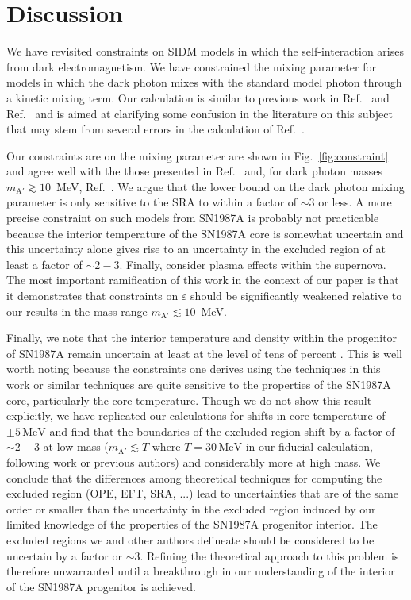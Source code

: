 \documentclass[nofootinbib,prd,superscriptaddress,twocolumn]{revtex4}
\begin{document}
\section{Discussion}
\label{section:conclusions}


We have revisited constraints on SIDM models in which the 
self-interaction arises from dark electromagnetism. We have 
constrained the mixing parameter for models in which the dark photon 
mixes with the standard model photon through a kinetic mixing term. Our calculation 
is similar to previous work in Ref.~\cite{dent_etal12} and Ref.~\cite{rrapaj_reddy16} and 
is aimed at clarifying some confusion in the literature on this subject that may stem 
from several errors in the calculation of Ref.~\cite{dent_etal12}.

Our constraints are on the mixing parameter are shown in 
Fig.~\ref{fig:constraint} and agree well with the those presented in 
Ref.~\cite{rrapaj_reddy16} and, for dark photon masses $m_{\mathrm{A}'} \gtrsim 10$~MeV, 
Ref.~\cite{hardy_lasenby17}. We argue that the lower bound on the dark photon mixing parameter 
is only sensitive to the SRA to within a factor of $\sim 3$ or less. A more precise constraint 
on such models from SN1987A is probably not practicable because the interior temperature 
of the SN1987A core is somewhat uncertain and this uncertainty alone gives rise to an uncertainty 
in the excluded region of at least a factor of $\sim 2-3$. Finally, \citet{hardy_lasenby17} consider 
plasma effects within the supernova. The most important ramification of this work in the context of 
our paper is that it demonstrates that constraints on $\varepsilon$ should be significantly weakened 
relative to our results in the mass range $m_{\mathrm{A}'} \lesssim 10$~MeV.

Finally, we note that the interior temperature and density within the progenitor of SN1987A remain 
uncertain at least at the level of tens of percent \citep[e.g.][]{perego15,farmer16}. This is well worth 
noting because the constraints one derives using the techniques in this work or similar techniques 
are quite sensitive to the properties of the SN1987A core, particularly the core temperature. Though 
we do not show this result explicitly, we have replicated our calculations for shifts in core temperature 
of $\pm 5\, \mathrm{MeV}$ and find that the boundaries of the excluded region shift by a factor of $\sim 2-3$ at low 
mass ($m_{\mathrm{A}'} \lesssim T$ where $T = 30\, \mathrm{MeV}$ in our fiducial calculation, following 
work or previous authors) and considerably more at high mass. 
We conclude that the differences among theoretical techniques for 
computing the excluded region (OPE, EFT, SRA, ...) lead to uncertainties that are of the same order or 
smaller than the uncertainty in the excluded region induced by our limited knowledge of the 
properties of the SN1987A progenitor interior. The excluded regions we and other authors delineate 
should be considered to be uncertain by a factor or $\sim 3$. Refining the theoretical approach to this 
problem is therefore unwarranted until a breakthrough in our understanding of the interior of the 
SN1987A progenitor is achieved.
\end{document}
